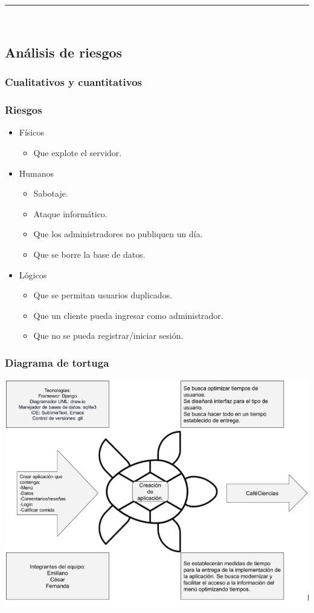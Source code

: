 \documentclass{article}
\begin{document}
\rule{0.8\textwidth}{.8pt}\\

\subsection*{Análisis de riesgos}
\subsubsection*{Cualitativos y cuantitativos}
\subsubsection*{Riesgos}
\begin{itemize}
\item Físicos
  \begin{itemize}
  \item Que explote el servidor.
  \end{itemize}
  
\item Humanos
  \begin{itemize}
  \item Sabotaje.
  \item Ataque informático.
  \item Que los administradores no publiquen un día.
  \item Que se borre la base de datos.
  \end{itemize}
    
\item Lógicos
  \begin{itemize}
  \item Que se permitan usuarios duplicados.
  \item Que un cliente pueda ingresar como administrador.
  \item Que no se pueda registrar/iniciar sesión.
  \end{itemize}
\end{itemize}
\subsubsection*{Diagrama de tortuga}
\includegraphics[scale=.5]{../imagenes/tortuga.png}
\end{document}
